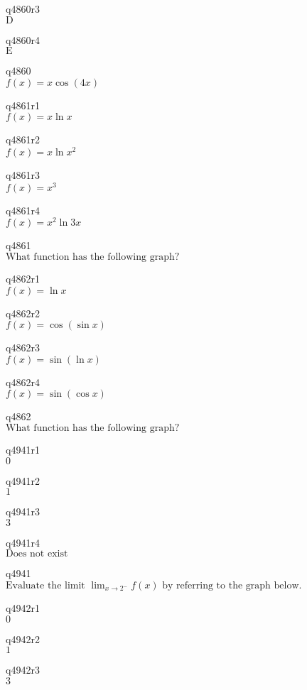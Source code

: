q4860r3\\
\(\displaystyle \text{D} \)

q4860r4\\
\(\displaystyle \text{E} \)

q4860\\
\(\displaystyle f(x) = x \cos (4x) \)

q4861r1\\
\(\displaystyle f(x) = x\ln x \)

q4861r2\\
\(\displaystyle f(x) = x \ln x^2 \)

q4861r3\\
\(\displaystyle f(x) = x^3 \)

q4861r4\\
\(\displaystyle f(x) = x^2 \ln 3x \)

q4861\\
\(\displaystyle \text{What function has the following graph?} \)

q4862r1\\
\(\displaystyle f(x) = \ln x \)

q4862r2\\
\(\displaystyle f(x) = \cos(\sin x) \)

q4862r3\\
\(\displaystyle f(x) = \sin(\ln x) \)

q4862r4\\
\(\displaystyle f(x) = \sin(\cos x) \)

q4862\\
\(\displaystyle \text{What function has the following graph?} \)

q4941r1\\
\(\displaystyle 0 \)

q4941r2\\
\(\displaystyle 1 \)

q4941r3\\
\(\displaystyle 3 \)

q4941r4\\
\(\displaystyle \text{Does not exist} \)

q4941\\
\(\displaystyle \text{Evaluate the limit } \lim_{x \rightarrow 2^-} f(x) \text{ by referring to the graph below.} \)

q4942r1\\
\(\displaystyle 0 \)

q4942r2\\
\(\displaystyle 1 \)

q4942r3\\
\(\displaystyle 3 \)

